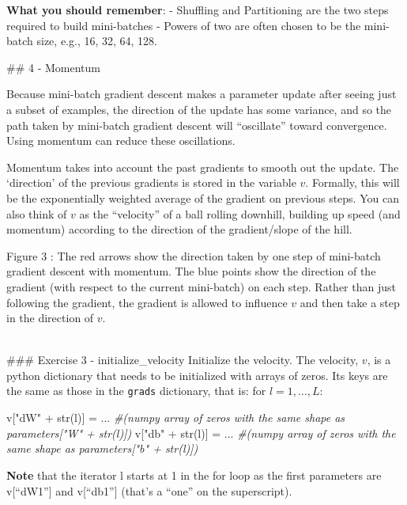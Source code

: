 \documentclass[11pt]{article}
\newenvironment{Shaded}{}{}
\newcommand{\StringTok}[1]{\textcolor[rgb]{0.25,0.44,0.63}{{#1}}}
\newcommand{\CommentTok}[1]{\textcolor[rgb]{0.38,0.63,0.69}{\textit{{#1}}}}
\newcommand{\NormalTok}[1]{{#1}}
\newcommand{\OperatorTok}[1]{\textcolor[rgb]{0.40,0.40,0.40}{{#1}}}
\newcommand{\BuiltInTok}[1]{{#1}}
\begin{document}
    \textbf{What you should remember}: - Shuffling and Partitioning are the
two steps required to build mini-batches - Powers of two are often
chosen to be the mini-batch size, e.g., 16, 32, 64, 128.

    \#\# 4 - Momentum

Because mini-batch gradient descent makes a parameter update after
seeing just a subset of examples, the direction of the update has some
variance, and so the path taken by mini-batch gradient descent will
``oscillate'' toward convergence. Using momentum can reduce these
oscillations.

Momentum takes into account the past gradients to smooth out the update.
The `direction' of the previous gradients is stored in the variable
\(v\). Formally, this will be the exponentially weighted average of the
gradient on previous steps. You can also think of \(v\) as the
``velocity'' of a ball rolling downhill, building up speed (and
momentum) according to the direction of the gradient/slope of the hill.

Figure 3 : The red arrows show the direction taken by one step of
mini-batch gradient descent with momentum. The blue points show the
direction of the gradient (with respect to the current mini-batch) on
each step. Rather than just following the gradient, the gradient is
allowed to influence \(v\) and then take a step in the direction of
\(v\).

    ~\\
\#\#\# Exercise 3 - initialize\_velocity Initialize the velocity. The
velocity, \(v\), is a python dictionary that needs to be initialized
with arrays of zeros. Its keys are the same as those in the
\texttt{grads} dictionary, that is: for \(l =1,...,L\):

\begin{Shaded}
\begin{Highlighting}[]
\NormalTok{v[}\StringTok{"dW"} \OperatorTok{+} \BuiltInTok{str}\NormalTok{(l)] }\OperatorTok{=}\NormalTok{ ... }\CommentTok{\#(numpy array of zeros with the same shape as parameters["W" + str(l)])}
\NormalTok{v[}\StringTok{"db"} \OperatorTok{+} \BuiltInTok{str}\NormalTok{(l)] }\OperatorTok{=}\NormalTok{ ... }\CommentTok{\#(numpy array of zeros with the same shape as parameters["b" + str(l)])}
\end{Highlighting}
\end{Shaded}

\textbf{Note} that the iterator l starts at 1 in the for loop as the
first parameters are v{[}``dW1''{]} and v{[}``db1''{]} (that's a ``one''
on the superscript).
\end{document}
